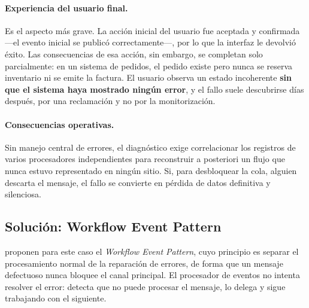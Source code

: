 \paragraph{Experiencia del usuario final.} Es el aspecto más grave. La acción inicial del usuario fue aceptada y confirmada ---el evento inicial se publicó correctamente---, por lo que la interfaz le devolvió éxito. Las consecuencias de esa acción, sin embargo, se completan solo parcialmente: en un sistema de pedidos, el pedido existe pero nunca se reserva inventario ni se emite la factura. El usuario observa un estado incoherente \textbf{sin que el sistema haya mostrado ningún error}, y el fallo suele descubrirse días después, por una reclamación y no por la monitorización.

\paragraph{Consecuencias operativas.} Sin manejo central de errores, el diagnóstico exige correlacionar los registros de varios procesadores independientes para reconstruir a posteriori un flujo que nunca estuvo representado en ningún sitio. Si, para desbloquear la cola, alguien descarta el mensaje, el fallo se convierte en pérdida de datos definitiva y silenciosa.

\subsection{Solución: Workflow Event Pattern}

\textcite{richardsford2020} proponen para este caso el \emph{Workflow Event Pattern}, cuyo principio es separar el procesamiento normal de la reparación de errores, de forma que un mensaje defectuoso nunca bloquee el canal principal. El procesador de eventos no intenta resolver el error: detecta que no puede procesar el mensaje, lo delega y sigue trabajando con el siguiente.

